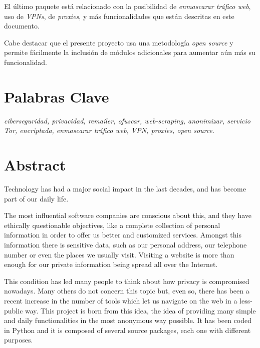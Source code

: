 El último paquete está relacionado con la posibilidad de
\textit{enmascarar tráfico web}, uso de \textit{VPNs}, de
\textit{proxies}, y más funcionalidades que están descritas en este
documento.

Cabe destacar que el presente proyecto usa una metodología
\textit{open source} y permite fácilmente la inclusión de módulos
adicionales para aumentar aún más su funcionalidad.

\section*{Palabras Clave}
\textit{ciberseguridad, privacidad, remailer, ofuscar, web-scraping, anonimizar, servicio Tor, encriptada, enmascarar tráfico web, VPN, proxies, open source}.
\newpage

\section*{Abstract}
Technology has had a major social impact in the last decades, and has become part of our daily life.

The most influential software companies are conscious about this, and
they have ethically questionable objectives, like a complete
collection of personal information in order to offer us better and
customized services. Amongst this information there is
sensitive data, such as our personal address, our telephone
number or even the places we usually visit.  Visiting a
  website is more than enough for our private information being spread
  all over the Internet.

This condition has led many people to think about how privacy is
compromised nowadays. Many others do not concern this topic but, even so, there
has been a recent increase in the number of tools which let us
navigate on the web in a less-public way. This project is born from
this idea, the idea of providing many simple and daily functionalities
in the most anonymous way possible. It has been coded in Python and it
is composed of several source packages, each one with different
purposes.

